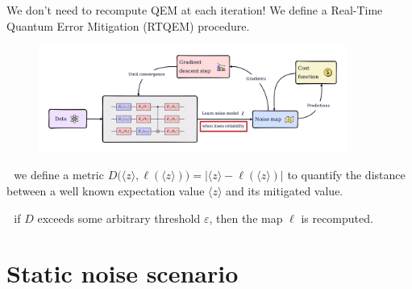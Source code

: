\documentclass[8pt, xcolor={svgnames}, hyperref={linkcolor=black}, aspectratio=169]{beamer}
\begin{document}
\begin{frame}{We don't need to recompute QEM at each iteration!}
\vspace{0.16cm}
We define a Real-Time Quantum Error Mitigation (RTQEM) procedure.
\begin{figure}
    \includegraphics[width=0.9\textwidth]{figures/rtqem_epsilon.png}
\end{figure}
\pause
\faEdit\,\, we define a metric $ D\bigl(\langle z \rangle, \ell(\langle z \rangle)\bigr) 
= |\langle z \rangle  - \ell(\langle z \rangle)|$
to quantify the distance between a well known expectation value $\langle z \rangle$ and its mitigated value.
\pause

\faAmbulance\,\, if $D$ exceeds some arbitrary threshold $\varepsilon$, then the
map $\ell$ is recomputed.
\end{frame}

\section{Static noise scenario}
\end{document}
